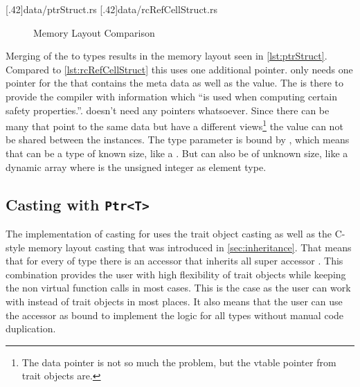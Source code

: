\documentclass[thesis]{subfiles}
\begin{document}
    \LstTikzBox{\ptrStruct}[.42\linewidth]{data/ptrStruct.rs}
    \LstTikzBox{\rcRefCellStruct}[.42\linewidth]{data/rcRefCellStruct.rs}
    \begin{figure}[ht]
      \captionsetup{type=lstlisting}
      \hfill%
      \caption{Memory Layout Comparison}\label{lst:memoryLayout}
    \end{figure}

    Merging of the to types results in the memory layout seen in \autoref{lst:ptrStruct}.
    Compared to \autoref{lst:rcRefCellStruct} this uses one additional pointer.
    \RcT only needs one pointer for the  that contains the meta data as well as the value.
    The  is there to provide the compiler with information which \enquote{is used when computing certain safety properties.}\autocite[std::marker::PhantomData]{rust-doc}.
    \RefCellT doesn't need any pointers whatsoever.
    Since there can be many \PtrTs that point to the same data but have a different views\footnote{
      The data pointer is not so much the problem, but the vtable pointer from trait objects are.
    } the value can not be shared between the \PtrT instances.
    The type parameter \T is bound by , which means that \T can be a type of known size, like a \struct.
    But \T can also be of unknown size, like a dynamic array \codr{[usize]} where  is the unsigned integer as element type\autocite[std::marker::Sized]{rust-doc}.

  \subsection{Casting with \texttt{Ptr<T>}}
    The implementation of casting for \PtrT uses the trait object casting as well as the C-style memory layout casting that was introduced in \autoref{sec:inheritance}.
    That means that for every \struct of type \T there is an accessor \trait that inherits all super accessor \traits.
    This combination provides the user with high flexibility of trait objects while keeping the non virtual function calls in most cases.
    This is the case as the user can work with \structs instead of trait objects in most places.
    It also means that the user can use the accessor \traits as bound to implement the logic for all types without manual code duplication.
\end{document}
